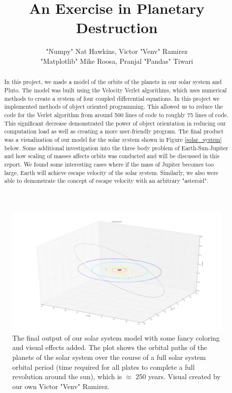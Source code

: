 \documentclass{article}
\title{An Exercise in Planetary Destruction}
\author{"Numpy" Nat Hawkins, Victor "Venv" Ramirez\\ "Matplotlib" Mike Roosa, Pranjal "Pandas" Tiwari}
\begin{document}
\maketitle
\begin{abstract}
In this project, we made a model of the orbits of the planets in our solar system and Pluto. The model was built using the Velocity Verlet algorithms, which uses numerical methods to create a system of four coupled differential equations. In this project we implemented methods of object oriented programming. This allowed us to reduce the code for the Verlet algorithm from around 500 lines of code to roughly 75 lines of code. This significant decrease demonstrated the power of object orientation in reducing our computation load as well as creating a more user-friendly program. The final product was a visualization  of our model for the solar system shown in Figure \ref{solar_system} below. Some additional investigation into the three body problem of Earth-Sun-Jupiter and how scaling of masses affects orbits was conducted and will be discussed in this report. We found some interesting cases where if the mass of Jupiter becomes too large, Earth will achieve escape velocity of the solar system. Similarly, we also were able to demonstrate the concept of escape velocity with an arbitrary "asteroid".
\end{abstract}

\begin{figure}[h!]
\includegraphics[width = \linewidth]{solar_system_pretty.png}
\caption{The final output of our solar system model with some fancy coloring and visual effects added. The plot shows the orbital paths of the planets of the solar system over the course of a full solar system orbital period (time required for all plates to complete a full revolution around the sun), which is $\approx$ 250 years. Visual created by our own Victor "Venv" Ramirez.}
\label{solar_system}
\end{figure}
\end{document}
